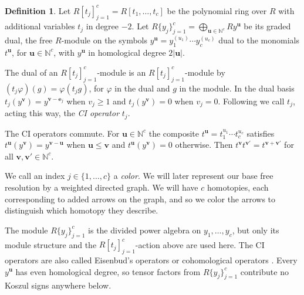 \documentclass[12pt]{amsart}
\theoremstyle{plain}
\theoremstyle{definition}
\newtheorem{definition}[theorem]{Definition}
\newcommand{\N}{\mathbb{N}}
\begin{document}
\begin{definition}\label{def:dp} \cite{Eisenbud1980}
    Let $R[t_j]_{j=1}^{c} = R[t_1, \dots, t_c]$ be the polynomial ring over $R$ with additional variables $t_j$ in degree $-2$. Let $R\{y_j\}_{j=1}^{c} = \bigoplus_{\boldsymbol{u} \in \N^c} R y^{\boldsymbol{u}}$ be its graded dual, the free $R$-module on the symbols $y^{\boldsymbol{u}} = y_1^{(u_1)} \cdots y_c^{(u_c)}$ dual to the monomials $t^{\boldsymbol{u}}$, for $\boldsymbol{u} \in \N^c$, with $y^{\boldsymbol{u}}$ in homological degree $2|\boldsymbol{u}|$.

    The dual of an $R[t_j]_{j=1}^{c}$-module is an $R[t_j]_{j=1}^{c}$-module by $(t_j \varphi)(g) = \varphi(t_j g)$, for $\varphi$ in the dual and $g$ in the module. In the dual basis $t_j(y^{\boldsymbol{v}}) = y^{\boldsymbol{v}-\boldsymbol{e}_j}$ when $v_j \ge 1$ and $t_j(y^{\boldsymbol{v}}) = 0$ when $v_j = 0$. Following \cite{EisenbudPeeva} we call $t_j$, acting this way, the \emph{CI operator} $t_j$.

    The CI operators commute. For $\boldsymbol{u} \in \N^c$ the composite $t^{\boldsymbol{u}} = t_1^{u_1} \cdots t_c^{u_c}$ satisfies $t^{\boldsymbol{u}}(y^{\boldsymbol{v}}) = y^{\boldsymbol{v}-\boldsymbol{u}}$ when $\boldsymbol{u} \le \boldsymbol{v}$ and $t^{\boldsymbol{u}}(y^{
    \boldsymbol{v}}) = 0$ otherwise. Then $t^{\boldsymbol{v}} t^{\boldsymbol{v'}} = t^{\boldsymbol{v} + \boldsymbol{v'}}$ for all $\boldsymbol{v}, \boldsymbol{v'} \in \N^c$.

    We call an index $j \in \{1, \dots, c\}$ a \emph{color}. We will later represent our base free resolution by a weighted directed graph. We will have $c$ homotopies, each corresponding to added arrows on the graph, and so we color the arrows to distinguish which homotopy they describe.
\end{definition}

The module $R\{y_j\}_{j=1}^{c}$ is the divided power algebra on $y_1, \dots, y_c$, but only its module structure and the $R[t_j]_{j=1}^{c}$-action above are used here. The CI operators are also called Eisenbud's operators or cohomological operators \cite{AvramovSixLectures}. Every $y^{\boldsymbol{u}}$ has even homological degree, so tensor factors from $R\{y_j\}_{j=1}^{c}$ contribute no Koszul signs anywhere below.
\end{document}
